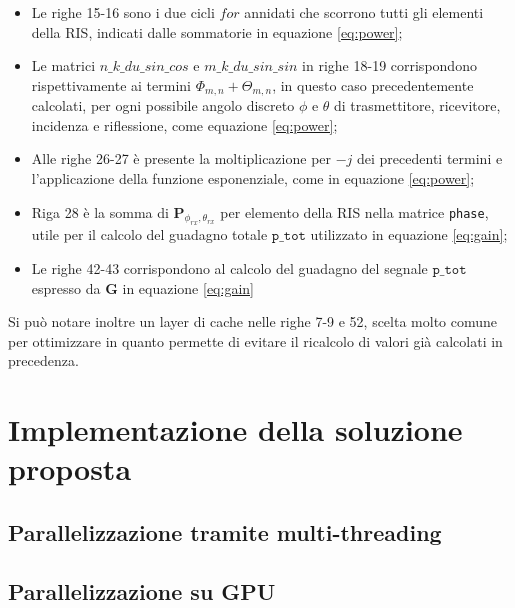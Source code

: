 \begin{itemize}
  \item Le righe 15-16 sono i due cicli $for$ annidati che scorrono tutti gli elementi
    della RIS, indicati dalle sommatorie in equazione \ref{eq:power};

  \item Le matrici $n\_k\_du\_sin\_cos$ e $m\_k\_du\_sin\_sin$ in righe 18-19 corrispondono
    rispettivamente ai termini $\Phi_{m,n}+\Theta_{m,n}$, in questo caso
    precedentemente calcolati, per ogni possibile angolo discreto $\phi$ e $\theta$
    di trasmettitore, ricevitore, incidenza e riflessione, come equazione
    \ref{eq:power};

  \item Alle righe 26-27 è presente la moltiplicazione per $-j$ dei precedenti termini
    e l'applicazione della funzione esponenziale, come in equazione
    \ref{eq:power};

  \item Riga 28 è la somma di $\textbf{P}_{\phi_{rx},\theta_{rx}}$ per elemento della
    RIS nella matrice \texttt{phase}, utile per il calcolo del guadagno totale $\texttt
    {p\_tot}$ utilizzato in equazione \ref{eq:gain};

  \item Le righe 42-43 corrispondono al calcolo del guadagno del segnale $\texttt
    {p\_tot}$ espresso da $\textbf{G}$ in equazione \ref{eq:gain}
\end{itemize}

Si può notare inoltre un layer di cache nelle righe 7-9 e 52, scelta molto comune
per ottimizzare in quanto permette di evitare il ricalcolo di valori già calcolati
in precedenza.

\section{Implementazione della soluzione proposta}
\label{sec:implementazione}

\lipsum[1]

\subsection{Parallelizzazione tramite multi-threading}
\label{subsec:multithreading}

\lipsum[1]

\subsection{Parallelizzazione su GPU}
\label{subsec:cuda}

